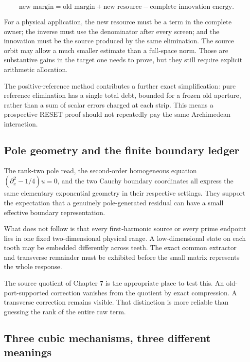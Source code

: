 \documentclass[
  10pt,
  a4paper,
  10pt,
  oneside,
  openany]{book}
\begin{document}
\[
 \text{new margin}
 =\text{old margin}+\text{new resource}
 -\text{complete innovation energy}.
 \tag{47.1}\label{eq:47.1}
\]

For a physical application, the new resource must be a term in the
complete owner; the inverse must use the denominator after every screen;
and the innovation must be the source produced by the same elimination.
The source orbit may allow a much smaller estimate than a full-space
norm. Those are substantive gains in the target one needs to prove, but
they still require explicit arithmetic allocation.

The positive-reference method contributes a further exact
simplification: pure reference elimination has a single total debt,
bounded for a frozen old aperture, rather than a sum of scalar errors
charged at each strip. This means a prospective RESET proof should not
repeatedly pay the same Archimedean interaction.

\subsection{Pole geometry and the finite boundary
ledger}\label{pole-geometry-and-the-finite-boundary-ledger}

The rank-two pole read, the second-order homogeneous equation
\((\partial_x^2-1/4)u=0\), and the two Cauchy boundary coordinates all
express the same elementary exponential geometry in their respective
settings. They support the expectation that a genuinely pole-generated
residual can have a small effective boundary representation.

What does not follow is that every first-harmonic source or every prime
endpoint lies in one fixed two-dimensional physical range. A
low-dimensional state on each tooth may be embedded differently across
teeth. The exact common extractor and transverse remainder must be
exhibited before the small matrix represents the whole response.

The source quotient of Chapter 7 is the appropriate place to test this.
An old-port-supported correction vanishes from the quotient by exact
compression. A transverse correction remains visible. That distinction
is more reliable than guessing the rank of the entire raw term.

\subsection{Three cubic mechanisms, three different
meanings}\label{three-cubic-mechanisms-three-different-meanings}
\end{document}
